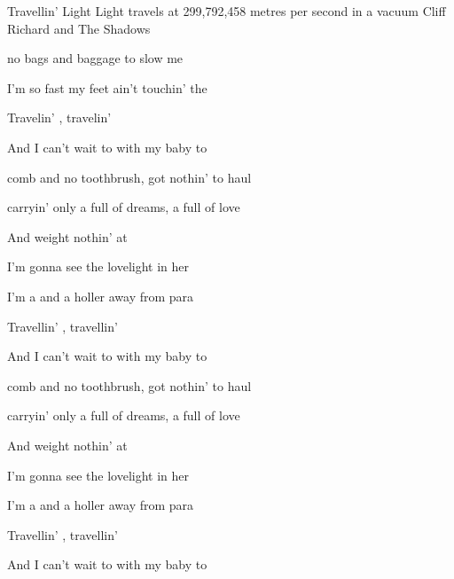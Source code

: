 \begin{SBSong}{Travellin' Light}
  {Light travels at 299,792,458 metres per second in a vacuum}
  {Cliff Richard and The Shadows}
  \begin{SBVerse}
	 no bags and baggage to slow me 
	
	I'm  so fast my feet ain't touchin' the 
	
	Travelin' , travelin' 
	
	And I  can't wait to  with my baby to 
  \end{SBVerse}
  \begin{SBChorus}
	 comb and no toothbrush,  got nothin' to haul
	
	 carryin' only a   full of dreams, a   full of love
	
	And   weight nothin' at 
  \end{SBChorus}
  \begin{SBVerse}
	 I'm gonna see the lovelight in her 
	
	I'm a  and a holler away from para
	
	Travellin' , travellin' 
	
	And I  can't wait to  with my baby to 
 \end{SBVerse}
  \begin{SBChorus}
	 comb and no toothbrush,  got nothin' to haul
	
	 carryin' only a   full of dreams, a   full of love
	
	And   weight nothin' at 
  \end{SBChorus}
  \begin{SBVerse}
	 I'm gonna see the lovelight in her 
	
	I'm a  and a holler away from para
	
	Travellin' , travellin' 
	
	And I  can't wait to  with my baby to 
  \end{SBVerse}
\end{SBSong}